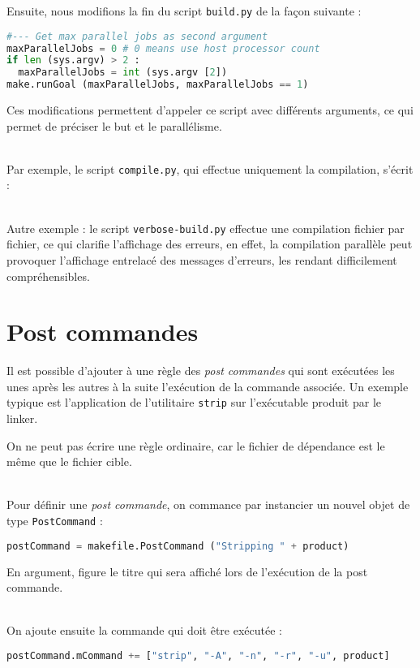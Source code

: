 \documentclass[a4paper,11pt]{extarticle}
\begin{document}
Ensuite, nous modifions la fin du script \texttt{build.py} de la façon suivante :
\begin{lstlisting}[language=py]
#--- Get max parallel jobs as second argument
maxParallelJobs = 0 # 0 means use host processor count
if len (sys.argv) > 2 :
  maxParallelJobs = int (sys.argv [2])
make.runGoal (maxParallelJobs, maxParallelJobs == 1)
\end{lstlisting}

Ces modifications permettent d'appeler ce script avec différents arguments, ce qui permet de préciser le but et le parallélisme.

~\\Par exemple, le script \texttt{compile.py}, qui effectue uniquement la compilation, s'écrit :



~\\Autre exemple : le script \texttt{verbose-build.py} effectue une compilation fichier par fichier, ce qui clarifie l'affichage des erreurs, en effet, la compilation parallèle peut provoquer l'affichage entrelacé des messages d'erreurs, les rendant difficilement compréhensibles.








\section{Post commandes}

Il est possible d'ajouter à une règle des \emph{post commandes} qui sont exécutées les unes après les autres à la suite l'exécution de la commande associée. Un exemple typique est l'application de l'utilitaire \texttt{strip} sur l'exécutable produit par le linker.

On ne peut pas écrire une règle ordinaire, car le fichier de dépendance est le même que le fichier cible.

~\\Pour définir une \emph{post commande}, on commance par instancier un nouvel objet de type \texttt{PostCommand} :
\begin{lstlisting}[language=py]
postCommand = makefile.PostCommand ("Stripping " + product)
\end{lstlisting}
En argument, figure le titre qui sera affiché lors de l'exécution de la post commande.

~\\On ajoute ensuite la commande qui doit être exécutée :
\begin{lstlisting}[language=py]
postCommand.mCommand += ["strip", "-A", "-n", "-r", "-u", product]
\end{lstlisting}
\end{document}
